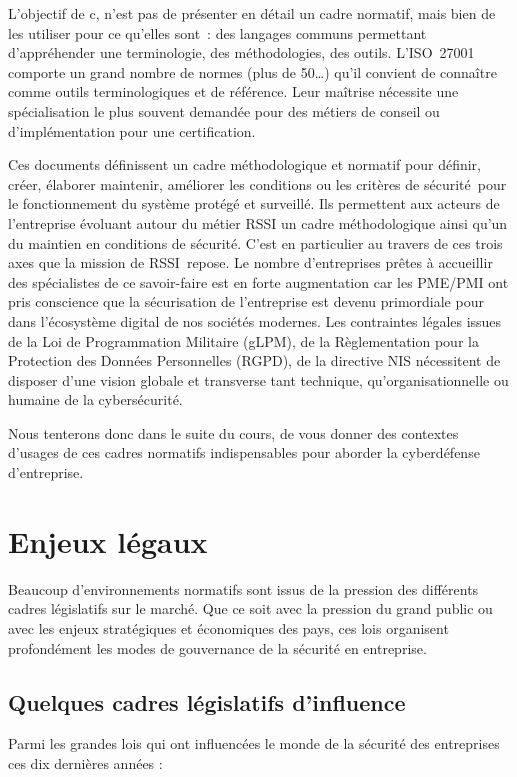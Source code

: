 \begin{nota}
L’objectif de c\edoc, n’est pas de présenter en détail un cadre normatif, mais bien de les utiliser pour ce qu’elles sont : des langages communs permettant d’appréhender une terminologie, des méthodologies, des outils. L’ISO~27001 comporte un grand nombre de normes (plus de 50…) qu’il convient de connaître comme outils terminologiques et de référence. Leur maîtrise nécessite une spécialisation le plus souvent demandée pour des métiers de conseil ou d’implémentation pour une certification.
\end{nota}

Ces documents définissent un cadre méthodologique et normatif pour définir, créer, élaborer maintenir, améliorer les conditions ou les critères de sécurité pour le fonctionnement du système protégé et surveillé. 
Ils permettent aux acteurs de l'entreprise évoluant autour du métier RSSI un cadre méthodologique ainsi qu’un  du maintien en conditions de sécurité. C’est en particulier au travers de ces trois axes que la mission de RSSI repose. 
Le nombre d’entreprises prêtes à accueillir des spécialistes de ce savoir-faire est en forte augmentation car les PME/PMI ont pris conscience que la sécurisation de l’entreprise est devenu primordiale pour  dans l’écosystème digital de nos sociétés modernes. Les contraintes légales issues de la Loi de Programmation Militaire (\gls{gLPM}), de la Règlementation pour la Protection des Données Personnelles (RGPD), de la directive NIS nécessitent de disposer d’une vision globale et transverse tant technique, qu'organisationnelle ou humaine de la cybersécurité.

Nous tenterons donc dans le suite du cours, de vous donner des contextes d'usages de ces cadres normatifs indispensables pour aborder la cyberdéfense d’entreprise. 

\section{Enjeux légaux}

Beaucoup d'environnements normatifs sont issus de la pression des différents cadres législatifs sur le marché. Que ce soit avec la pression du grand public ou avec les enjeux stratégiques et économiques des pays, ces lois organisent profondément les modes de gouvernance de la sécurité en entreprise.

\subsection{Quelques cadres législatifs d'influence}
Parmi les grandes lois qui ont influencées  le monde de la sécurité des entreprises ces dix dernières années :


